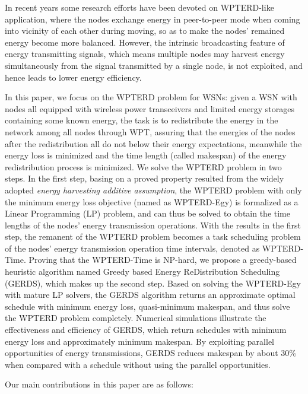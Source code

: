 \documentclass[journal,10pt]{IEEEtran}
\begin{document}
In recent years some research efforts have been devoted on WPTERD-like application, where the nodes exchange energy in peer-to-peer mode when coming into vicinity of each other during moving, so as to make the nodes' remained energy become more balanced. However, the intrinsic broadcasting feature of energy transmitting signals, which means multiple nodes may harvest energy simultaneously from the signal transmitted by a single node, is not exploited, and hence leads to lower energy efficiency.

In this paper, we focus on the WPTERD problem for WSNs: given a WSN with nodes all equipped with wireless power transceivers and limited energy storages containing some known energy, the task is to redistribute the energy in the network among all nodes through WPT, assuring that the energies of the nodes after the redistribution all do not below their energy expectations, meanwhile the energy loss is minimized and the time length (called makespan) of the energy redistribution process is minimized. We solve the WPTERD problem in two steps. In the first step, basing on a proved property resulted from the widely adopted \textit{energy harvesting additive assumption}, the WPTERD problem with only the minimum energy loss objective (named as WPTERD-Egy) is formalized as a Linear Programming (LP) problem, and can thus be solved to obtain the time lengths of the nodes' energy transmission operations. With the results in the first step, the remanent of the WPTERD problem becomes a task scheduling problem of the nodes' energy transmission operation time intervals, denoted as WPTERD-Time. Proving that the WPTERD-Time is NP-hard, we propose a greedy-based heuristic algorithm named Greedy based Energy ReDistribution Scheduling (GERDS), which makes up the second step. Based on solving the WPTERD-Egy with mature LP solvers, the GERDS algorithm returns an approximate optimal schedule with minimum energy loss, quasi-minimum makespan, and thus solve the WPTERD problem completely. Numerical simulations illustrate the effectiveness and efficiency of GERDS, which return schedules with minimum energy loss and approximately minimum makespan. By exploiting parallel opportunities of energy transmissions, GERDS reduces makespan by about 30\% when compared with a schedule without using the parallel opportunities.

Our main contributions in this paper are as follows:
\end{document}
